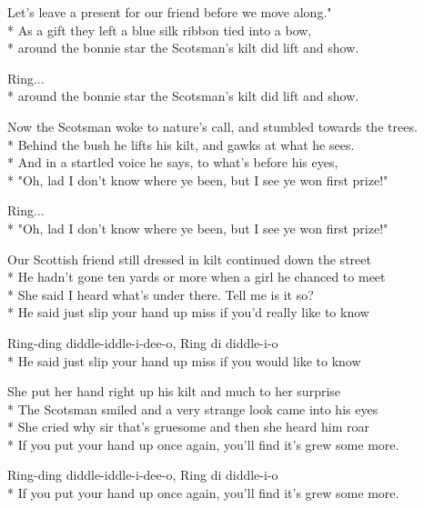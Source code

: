 \begin{SongText}
\begin{SongVerse}
        Let's leave a present for our friend before we move along."\\*%
        As a gift they left a blue silk ribbon tied into a bow,\\*%
        around the bonnie star the Scotsman's kilt did lift and show.
    \end{SongVerse}
    \begin{SongVerse}
        Ring...\\*%
        around the bonnie star the Scotsman's kilt did lift and show.
    \end{SongVerse}
    \begin{SongVerse}
        Now the Scotsman woke to nature's call, and stumbled towards the trees.\\*%
        Behind the bush he lifts his kilt, and gawks at what he sees.\\*%
        And in a startled voice he says, to what's before his eyes,\\*%
        "Oh, lad I don't know where ye been, but I see ye won first prize!"
    \end{SongVerse}
    \begin{SongVerse}
        Ring...\\*%
        "Oh, lad I don't know where ye been, but I see ye won first prize!"
    \end{SongVerse}
    \begin{SongVerse}
        Our Scottish friend still dressed in kilt continued down the street\\*%
        He hadn't gone ten yards or more when a girl he chanced to meet\\*%
        She said I heard what's under there. Tell me is it so?\\*%
        He said just slip your hand up miss if you'd really like to know
    \end{SongVerse}
    \begin{SongVerse}
        Ring-ding diddle-iddle-i-dee-o, Ring di diddle-i-o\\*%
        He said just slip your hand up miss if you would like to know
    \end{SongVerse}
    \begin{SongVerse}
        She put her hand right up his kilt and much to her surprise\\*%
        The Scotsman smiled and a very strange look came into his eyes\\*%
        She cried why sir that’s gruesome and then she heard him roar\\*%
        If you put your hand up once again, you'll find it's grew some more.
    \end{SongVerse}
    \begin{SongVerse}
        Ring-ding diddle-iddle-i-dee-o, Ring di diddle-i-o\\*%
        If you put your hand up once again, you'll find it's grew some more.
    \end{SongVerse}
\end{SongText}
